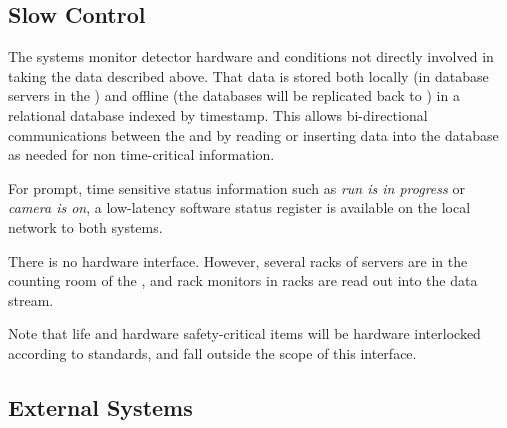 \subsection{Slow Control}
\label{sec:fd-daq-intfc-sc}
\label{sec:fd-daq-intfc-sc}

The  systems monitor detector hardware and conditions not
directly involved in taking the data described above.
That data is stored both locally (in  database servers in the
) and offline (the databases will be replicated back to \fnal)
in a relational database indexed by timestamp.
This allows bi-directional communications between the  and  by
reading or inserting data into the database as needed for non
time-critical information.  

For prompt, time sensitive status information such as \textit{run is in
progress} or \textit{camera is on}, a low-latency software status register
is available on the local network to both systems.

There is no hardware interface. However, several racks of  servers are in the counting room of the , and rack monitors in  racks are read out into the  data stream.

Note that life and hardware safety-critical items will be hardware
interlocked %
according to \fnal standards, and fall outside the scope of this interface.


\subsection{External Systems} %
\label{sec:fd-daq-intfc-ext}



